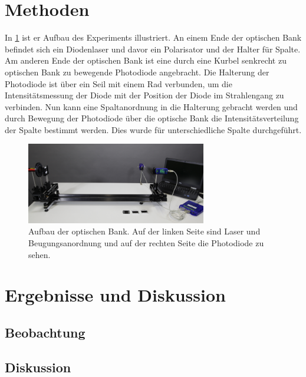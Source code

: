 \documentclass[
	a4paper,
	12pt,
	pagesize,
	ngerman
]{scrartcl}
\begin{document}
	\section{Methoden}
	In \cref{optischeBank} ist er Aufbau des Experiments illustriert.
	An einem Ende der optischen Bank befindet sich ein Diodenlaser und davor ein Polarisator und der Halter für Spalte.
	Am anderen Ende der optischen Bank ist eine durch eine Kurbel senkrecht zu optischen Bank zu bewegende Photodiode angebracht.
	Die Halterung der Photodiode ist über ein Seil mit einem Rad verbunden, um die Intensitätsmessung der Diode mit der Position der Diode im Strahlengang zu verbinden.
	Nun kann eine Spaltanordnung in die Halterung gebracht werden und durch Bewegung der Photodiode über die optische Bank die Intensitätsverteilung der Spalte bestimmt werden.
	Dies wurde für unterschiedliche Spalte durchgeführt. %
	
	\begin{figure}[H]
		\includegraphics[width=0.7\textwidth]{optischeBank}
		\centering
		\caption{Aufbau der optischen Bank. Auf der linken Seite sind Laser und Beugungsanordnung und auf der rechten Seite die Photodiode zu sehen.\cite{optischeBank} }
		\label{optischeBank}
		\centering
	\end{figure} 
	
	\section{Ergebnisse und Diskussion}
	

	\subsection{Beobachtung}

	\subsection{Diskussion}
	
\end{document}

